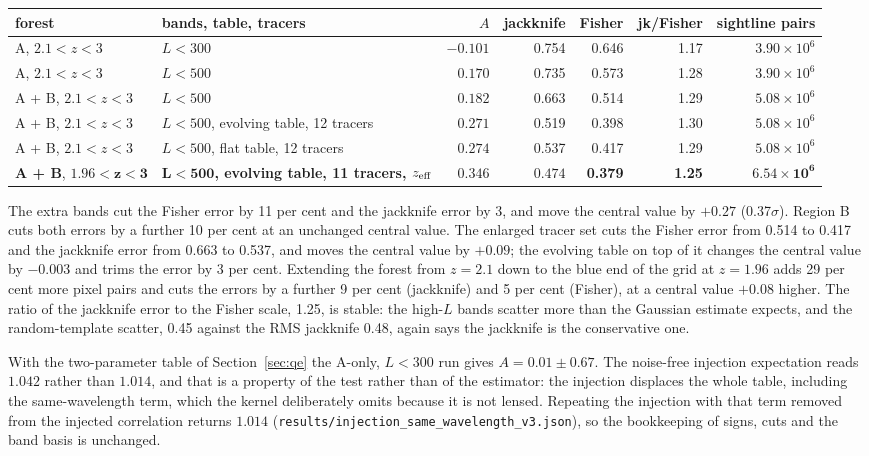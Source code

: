 \documentclass[11pt,a4paper]{article}
\begin{document}
\begin{center}\small
\begin{tabular}{llrrrrr}
\toprule
forest & bands, table, tracers & $A$ & jackknife & Fisher & jk/Fisher & sightline pairs\\
\midrule
A, $2.1<z<3$ & $L<300$ & $-0.101$ & 0.754 & 0.646 & 1.17 & $3.90\times10^6$\\
A, $2.1<z<3$ & $L<500$ & $0.170$ & 0.735 & 0.573 & 1.28 & $3.90\times10^6$\\
A + B, $2.1<z<3$ & $L<500$ & $0.182$ & 0.663 & 0.514 & 1.29 & $5.08\times10^6$\\
A + B, $2.1<z<3$ & $L<500$, evolving table, 12 tracers & $0.271$ & 0.519 & 0.398 & 1.30 & $5.08\times10^6$\\
A + B, $2.1<z<3$ & $L<500$, flat table, 12 tracers & $0.274$ & 0.537 & 0.417 & 1.29 & $5.08\times10^6$\\
\textbf{A + B}, $\bm{1.96<z<3}$ & $\bm{L<500}$\textbf{, evolving table, 11 tracers, $z_{\rm eff}$} & $\mathbf{0.346}$ & $\mathbf{0.474}$ & \textbf{0.379} & \textbf{1.25} & $\bm{6.54\times10^6}$\\
\bottomrule
\end{tabular}
\end{center}

\noindent The extra bands cut the Fisher error by 11 per cent and the jackknife error by 3, and move the central value by $+0.27$ (0.37$\sigma$). Region B cuts both errors by a further 10 per cent at an unchanged central value. The enlarged tracer set cuts the Fisher error from 0.514 to 0.417 and the jackknife error from 0.663 to 0.537, and moves the central value by $+0.09$; the evolving table on top of it changes the central value by $-0.003$ and trims the error by 3 per cent. Extending the forest from $z=2.1$ down to the blue end of the grid at $z=1.96$ adds 29 per cent more pixel pairs and cuts the errors by a further 9 per cent (jackknife) and 5 per cent (Fisher), at a central value $+0.08$ higher. The ratio of the jackknife error to the Fisher scale, 1.25, is stable: the high-$L$ bands scatter more than the Gaussian estimate expects, and the random-template scatter, 0.45 against the RMS jackknife 0.48, again says the jackknife is the conservative one.

With the two-parameter table of Section~\ref{sec:qe} the A-only, $L<300$ run gives $A=0.01\pm0.67$. The noise-free injection expectation reads $1.042$ rather than $1.014$, and that is a property of the test rather than of the estimator: the injection displaces the whole table, including the same-wavelength term, which the kernel deliberately omits because it is not lensed. Repeating the injection with that term removed from the injected correlation returns $1.014$ (\texttt{results/injection\_same\_wavelength\_v3.json}), so the bookkeeping of signs, cuts and the band basis is unchanged.
\end{document}
